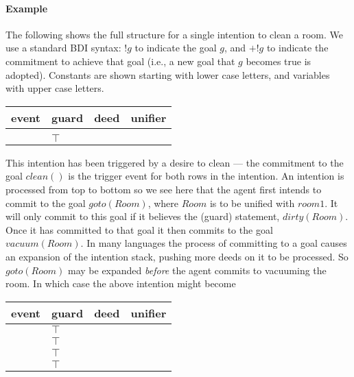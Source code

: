 \documentclass[a4]{article}
\newenvironment{stacks}{
\smaller
\begin{tabular}{l|l|l|l} 
\hline
event & guard & deed & unifier \\ 
\hline \hline} {
\cr \hline 
\end{tabular}
}
\begin{document}
\paragraph{Example} The following shows the full structure for a
single intention to clean a room.  We use a standard BDI syntax: $!g$
to indicate the goal $g$, and $+!g$ to indicate the commitment to
achieve that goal (i.e., a new goal that $g$ becomes true is
adopted). Constants are shown starting with lower case letters, and
variables with upper case letters.
\begin{center}
        \begin{stacks}
                \inlinecode{+!clean()} & 
                \inlinecode{dirty(Room)} & 
                \inlinecode{+!goto(Room)} &
                \inlinecode{Room = room1} \\
                \inlinecode{+!clean()} & 
                $\top$ & 
                \inlinecode{+!vacuum(Room)} & 
                \inlinecode{Room = room1} 
        \end{stacks}
\end{center}
This intention has been triggered by a desire to clean --- the
commitment to the goal
$clean()$ is the trigger event for both rows in the intention.  An
intention is processed from top to bottom so we see here that the
agent first intends to commit to the goal $goto(Room)$, where $Room$
is to be unified with $room1$.  It will only commit to this goal if it
believes the (guard) statement, $dirty(Room)$.  Once it has committed
to that goal it then commits to the goal $\mathit{vacuum}(Room)$.  In many
languages the process of committing to a goal causes an expansion of
the intention stack, pushing more deeds on it to be processed.  So
$goto(Room)$ may be expanded
\emph{before} the agent commits to vacuuming the room.  In which case
the above intention might become
\begin{center}
        \begin{stacks}
                \inlinecode{+!goto(Room)} &
                $\top$ & 
\inlinecode{+!planRoute(Room, Route)} &
\inlinecode{Room = room1} \\
                \inlinecode{+!goto(Room)} &
$\top$ & 
\inlinecode{+!follow(Route)} & 
\inlinecode{Room = room1} \\
                \inlinecode{+!goto(Room)} & 
                $\top$ & 
\inlinecode{+!enter(Room)} &
\inlinecode{Room = room1} \\
                \inlinecode{+!clean()} & 
$\top$ & 
\inlinecode{+!vacuum(Room)} & 
\inlinecode{Room = room1} 
        \end{stacks}
\end{center}
\end{document}
